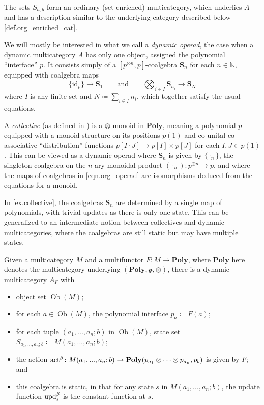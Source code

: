 \documentclass[11pt, one side, article]{memoir}
\theoremstyle{definition}
\theoremstyle{plain}
\newenvironment{example}
  {\pushQED{\qed}\renewcommand{\qedsymbol}{$\lozenge$}\examplex}
  {\popQED\endexamplex}
\DeclareMathOperator{\ob}{Ob}
\newcommand{\Cat}[1]{\mathbf{#1}}%
\newcommand{\id}{\mathrm{id}}
\newcommand{\tn}[1]{\textnormal{#1}}
\newcommand{\nn}{\mathbb{N}}
\newcommand{\act}{\tn{act}}
\newcommand{\upd}{\tn{upd}}
\newcommand{\yon}{\mathcal{y}}
\newcommand{\poly}{\Cat{Poly}}
\newcommand{\0}{\textsf{0}}
\newcommand{\1}{\tn{\textsf{1}}}
\newcommand{\qqand}{\qquad\text{and}\qquad}
\renewcommand{\S}{{\Cat{S}}}
\newcommand{\idcoalg}[1]{{\{\id_{#1}\}}}
\newcommand{\dnote}[1]{{\color{blue}David says:}~#1\quad{\color{blue}$\lozenge$}}
\begin{document}
The sets $S_{a,b}$ form an ordinary (set-enriched) multicategory, which underlies $A$ and has a description similar to the underlying category described below \cref{def.org_enriched_cat}. 

We will mostly be interested in what we call a \emph{dynamic operad}, the case when a dynamic multicategory $A$ has only one object, assigned the polynomial ``interface'' $p$. It consists simply of a $[p^{\otimes n},p]$-coalgebra $\S_n$ for each $n \in \nn$, equipped with coalgebra maps
\begin{equation}\label{eqn.org_operad}
\idcoalg{p} \to \S_1
\qqand
\bigotimes_{i\in I} \S_{n_i} \to \S_N
\end{equation}
where $I$ is any finite set and $N\coloneqq\sum_{i\in I}n_i$, which together satisfy the usual equations. %

\begin{example}\label{ex.collective}
A \emph{collective} (as defined in \cite{niu2021collectives}) is a $\otimes$-monoid in $\poly$, meaning a polynomial $p$ equipped with a monoid structure on its positions $p(1)$ and co-unital co-associative ``distribution'' functions $p[I \cdot J] \to p[I] \times p[J]$ for each $I,J \in p(1)$. This can be viewed as a dynamic operad where $\S_n$ is given by $\{\cdot_n\}$, the singleton coalgebra on the $n$-ary monoidal product $(\cdot_n)\colon p^{\otimes n} \to p$, and where the maps of coalgebras in \eqref{eqn.org_operad} are isomorphisms deduced from the equations for a monoid.
\end{example}

\begin{example}
In \cref{ex.collective}, the coalgebras $\S_n$ are determined by a single map of polynomials, with trivial updates as there is only one state. This can be generalized to an intermediate notion between collectives and dynamic multicategories, where the coalgebras are still static but may have multiple states.

Given a multicategory $M$ and a multifunctor $F\colon M \to\poly$, where $\poly$ here denotes the multicategory underlying $(\poly,\yon,\otimes)$, there is a dynamic multicategory $A_F$ with 
\begin{itemize}
	\item object set $\ob(M)$;
	\item for each $a \in \ob(M)$, the polynomial interface $p_a \coloneqq F(a)$;
	\item for each tuple $(a_1,...,a_n;b)$ in $\ob(M)$, state set $S_{a_1,...,a_n;b} \coloneqq M(a_1,...,a_n;b)$;
	\item the action $\act^\beta\colon M(a_1,...,a_n;b) \to \poly(p_{a_1} \otimes \cdots \otimes p_{a_n},p_b)$ is given by $F$; and 
	\item this coalgebra is static, in that for any state $s$ in $M(a_1,...,a_n;b)$, the update function $\upd^\beta_s$ is the constant function at $s$.
	\qedhere
\end{itemize}
\end{example}
\end{document}
